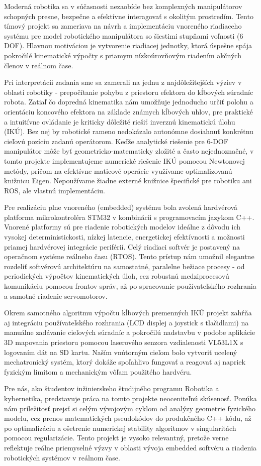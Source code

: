 Moderná robotika sa v súčasnosti nezaobíde bez komplexných manipulátorov schopných presne, bezpečne a efektívne
interagovať s okolitým prostredím. 
Tento tímový projekt sa zameriava na návrh a implementáciu vnoreného riadiaceho systému pre model robotického 
manipulátora so šiestimi stupňami voľnosti (6 DOF). 
Hlavnou motiváciou je vytvorenie riadiacej jednotky, ktorá úspešne 
spája pokročilé kinematické výpočty s priamym nízkoúrovňovým 
riadením akčných členov v reálnom čase.

Pri interpretácii zadania sme sa zamerali na jednu z najdôležitejších výziev v oblasti robotiky - 
prepočítanie pohybu z priestoru efektora do kĺbových súradníc robota. 
Zatiaľ čo dopredná kinematika nám umožňuje jednoducho určiť polohu a orientáciu koncového efektora na 
základe známych kĺbových uhlov, pre praktické a intuitívne ovládanie je 
kriticky dôležité riešiť inverznú kinematickú úlohu (IKÚ). Bez nej by robotické rameno nedokázalo autonómne 
dosiahnuť konkrétnu cieľovú pozíciu zadanú operátorom. 
Keďže analytické riešenie pre 6-DOF manipulátor môže byť geometricko-matematicky zložité a často 
nejednoznačné, v tomto projekte implementujeme numerické riešenie 
IKÚ pomocou Newtonovej metódy, pričom na efektívne maticové operácie využívame optimalizovanú knižnicu Eigen.
Nepoužívame žiadne externé knižnice špecifické pre robotiku ani ROS, ale vlastnú implementáciu.

Pre realizáciu plne vnoreného (embedded) systému bola zvolená hardvérová platforma mikrokontroléra STM32 
v kombinácii s programovacím jazykom C++. 
Vnorené platformy sú pre riadenie robotických modelov ideálne z dôvodu ich vysokej deterministickosti, 
nízkej latencie, energetickej efektívnosti a možnosti 
priamej hardvérovej integrácie periférií. Celý riadiaci softvér je postavený na operačnom systéme reálneho 
času (RTOS). Tento prístup nám umožnil elegantne rozdeliť 
softvérovú architektúru na samostatné, paralelne bežiace procesy - od periodických výpočtov kinematických 
úloh, cez robustnú medziprocesovú komunikáciu pomocou frontov správ, 
až po spracovanie používateľského rozhrania a samotné riadenie servomotorov.

Okrem samotného algoritmu výpočtu kĺbových premenných IKÚ projekt zahŕňa aj integráciu používateľského rozhrania (LCD displej 
a joystick s tlačidlami) na manuálne zadávanie cieľových súradníc a 
pokročilú nadstavbu v podobe aplikácie 3D mapovania priestoru pomocou laserového senzora vzdialenosti VL53L1X 
s logovaním dát na SD kartu. 
Naším vnútorným cieľom bolo vytvoriť ucelený mechatronický systém, ktorý dokáže spoľahlivo 
fungovať a reagovať aj napriek fyzickým limitom a 
mechanickým vôľam použitého hardvéru.

Pre nás, ako študentov inžinierskeho študijného programu Robotika a kybernetika, predstavuje práca na tomto 
projekte neoceniteľnú skúsenosť. 
Ponúka nám príležitosť prejsť si celým vývojovým cyklom od analýzy geometrie fyzického modelu, cez prenos 
matematických pseudokódov do produkčného C++ kódu, 
až po optimalizáciu a ošetrenie numerickej stability algoritmov v singularitách pomocou regularizácie. 
Tento projekt je vysoko relevantný, 
pretože verne reflektuje reálne priemyselné výzvy v oblasti vývoja embedded softvéru a riadenia robotických 
systémov v reálnom čase.